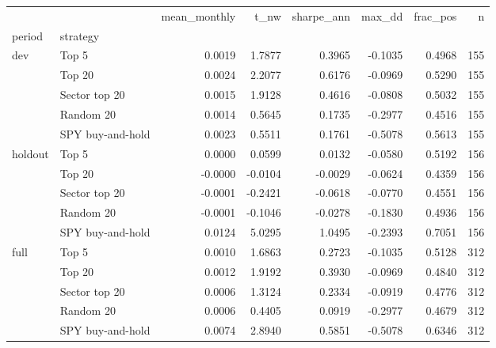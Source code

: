 \begin{tabular}{llrrrrrr}
\toprule
 &  & mean_monthly & t_nw & sharpe_ann & max_dd & frac_pos & n \\
period & strategy &  &  &  &  &  &  \\
\midrule
\multirow[t]{5}{*}{dev} & Top 5 & 0.0019 & 1.7877 & 0.3965 & -0.1035 & 0.4968 & 155 \\
 & Top 20 & 0.0024 & 2.2077 & 0.6176 & -0.0969 & 0.5290 & 155 \\
 & Sector top 20 & 0.0015 & 1.9128 & 0.4616 & -0.0808 & 0.5032 & 155 \\
 & Random 20 & 0.0014 & 0.5645 & 0.1735 & -0.2977 & 0.4516 & 155 \\
 & SPY buy-and-hold & 0.0023 & 0.5511 & 0.1761 & -0.5078 & 0.5613 & 155 \\
\cline{1-8}
\multirow[t]{5}{*}{holdout} & Top 5 & 0.0000 & 0.0599 & 0.0132 & -0.0580 & 0.5192 & 156 \\
 & Top 20 & -0.0000 & -0.0104 & -0.0029 & -0.0624 & 0.4359 & 156 \\
 & Sector top 20 & -0.0001 & -0.2421 & -0.0618 & -0.0770 & 0.4551 & 156 \\
 & Random 20 & -0.0001 & -0.1046 & -0.0278 & -0.1830 & 0.4936 & 156 \\
 & SPY buy-and-hold & 0.0124 & 5.0295 & 1.0495 & -0.2393 & 0.7051 & 156 \\
\cline{1-8}
\multirow[t]{5}{*}{full} & Top 5 & 0.0010 & 1.6863 & 0.2723 & -0.1035 & 0.5128 & 312 \\
 & Top 20 & 0.0012 & 1.9192 & 0.3930 & -0.0969 & 0.4840 & 312 \\
 & Sector top 20 & 0.0006 & 1.3124 & 0.2334 & -0.0919 & 0.4776 & 312 \\
 & Random 20 & 0.0006 & 0.4405 & 0.0919 & -0.2977 & 0.4679 & 312 \\
 & SPY buy-and-hold & 0.0074 & 2.8940 & 0.5851 & -0.5078 & 0.6346 & 312 \\
\cline{1-8}
\bottomrule
\end{tabular}
